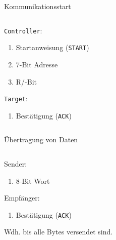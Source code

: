 \documentclass[12pt, aspectratio=169]{beamer}
\newcounter{listnum}
\begin{document}
	\begin{frame}{Kommunikationsstart}
		\begin{columns}
			\begin{column}{0.45\textwidth}
				\texttt{Controller}:
				\begin{enumerate}
					\item Startanweisung (\texttt{START})
					\item 7-Bit Adresse
					\item R/-Bit
					
					\setcounter{listnum}{\value{enumi}}
				\end{enumerate}
				\texttt{Target}:
				\begin{enumerate}
					\setcounter{enumi}{\value{listnum}}
					
					\item Bestätigung (\texttt{ACK})
				\end{enumerate}
			\end{column}
			\begin{column}{0.5\textwidth}
				\begin{figure}
					
				\end{figure}
			\end{column}
		\end{columns}
	\end{frame}

	\begin{frame}{Übertragung von Daten}
		\begin{columns}
			\begin{column}{0.45\textwidth}
				Sender:
				\begin{enumerate}
					\item 8-Bit Wort
					
					\setcounter{listnum}{\value{enumi}}
				\end{enumerate}
				
				Empfänger:
				\begin{enumerate}
					\setcounter{enumi}{\value{listnum}}
					
					\item Bestätigung (\texttt{ACK})
				\end{enumerate}
				
				\vspace{5ex}
				Wdh. bis alle Bytes versendet sind.
			\end{column}
			\begin{column}{0.5\textwidth}
				\begin{figure}
					
				\end{figure}
			\end{column}
		\end{columns}
	\end{frame}
\end{document}
